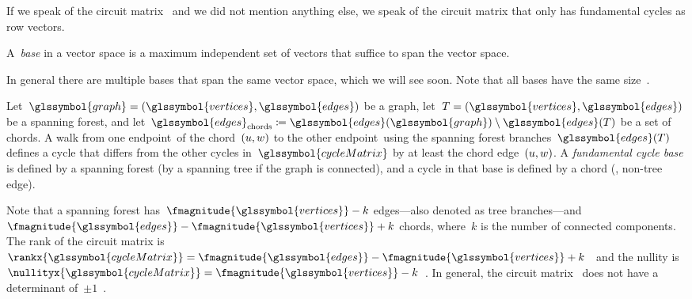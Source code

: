 If we speak of the circuit matrix~ and we did not mention
anything else, we speak of the circuit matrix that only has fundamental cycles
as row vectors.
% 
\begin{definition}[Base]
    A~\emph{base} in a vector space is a maximum independent set of vectors that
    suffice to span the vector space.
    \label{ch:network-analyzes:sec:mathematical-model:def:base}
\end{definition}
% 
In general there are multiple bases that span the same vector space, which we
will see soon. Note that all bases have the same size~\parencite[p.514;
Theorem~6]{Whi35}.
% 
% 
\begin{definition}
    Let~$
        \glssymbol{graph} = ( \glssymbol{vertices}, \glssymbol{edges} )
    $ be a graph, let~$
        \tree = ( \glssymbol{vertices}, \glssymbol{edges} )
    $ be a spanning forest, and let~$
        \glssymbol{edges}_{\mathrm{chords}}
        \coloneqq
        \glssymbol{edges}(\glssymbol{graph})
        \setminus
        \glssymbol{edges}(\tree)
    $ be a set of chords. A walk from one endpoint~\vertexa of the
    chord~$(u, w)$ to the other endpoint~\vertexc using the
    spanning forest branches~$\glssymbol{edges}(\tree)$ defines a cycle that
    differs from the other cycles in~$\glssymbol{cycleMatrix}$ by at least the
    chord edge~$(u,w)$. 
    A \emph{fundamental cycle base} is defined by a spanning forest (by a
    spanning tree if the graph is connected), and a cycle in that base is
    defined by a chord (\ie, non-tree edge). 
    \label{ch:network-analyzes:sec:mathematical-model:def:fundamental-cycle}
\end{definition}
% 
Note that a spanning forest has~$
    \fmagnitude{\glssymbol{vertices}} - k
$ edges---also denoted as tree branches---and~$
    \fmagnitude{\glssymbol{edges}} 
    -
    \fmagnitude{\glssymbol{vertices}} 
    + k
$ chords, where~$k$ is the number of connected components. The rank of the
circuit matrix is~$
    \rankx{\glssymbol{cycleMatrix}} 
    = 
    \fmagnitude{\glssymbol{edges}} 
    -
    \fmagnitude{\glssymbol{vertices}} 
    + k
$~\parencite[p.66;Theorem 4-5]{Ses61} and
the nullity is~$
    \nullityx{\glssymbol{cycleMatrix}} 
    = 
    \fmagnitude{\glssymbol{vertices}}
    - k
$~\parencite[p.64;Corollary 4-4]{Ses61}. In general, the circuit
matrix~ does not have a determinant of~$\pm
1$~\parencite{Oka55}\parencite[p.12; Lemma 3.3]{Kav09}. 

